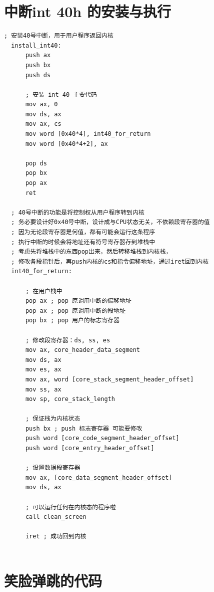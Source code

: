 \documentclass[forprint]{WHUBachelor}
\begin{document}
\chapter{中断int 40h 的安装与执行}

\label{code:int40h}
\begin{lstlisting}[language={[x86masm]Assembler}]
  ; 安装40号中断，用于用户程序返回内核
  install_int40:
      push ax
      push bx
      push ds
  
      ; 安装 int 40 主要代码
      mov ax, 0
      mov ds, ax
      mov ax, cs
      mov word [0x40*4], int40_for_return 
      mov word [0x40*4+2], ax
      
      pop ds
      pop bx
      pop ax
      ret
  
  ; 40号中断的功能是将控制权从用户程序转到内核
  ; 务必要设计好0x40号中断，设计成与CPU状态无关，不依赖段寄存器的值
  ; 因为无论段寄存器是何值，都有可能会运行这条程序
  ; 执行中断的时候会将地址还有符号寄存器存到堆栈中
  ; 考虑先将堆栈中的东西pop出来，然后转移堆栈到内核栈，
  ; 修改各段指针后，再push内核的cs和指令偏移地址，通过iret回到内核
  int40_for_return:
  
      ; 在用户栈中
      pop ax ; pop 原调用中断的偏移地址
      pop ax ; pop 原调用中断的段地址
      pop bx ; pop 用户的标志寄存器
  
      ; 修改段寄存器：ds, ss, es
      mov ax, core_header_data_segment
      mov ds, ax
      mov es, ax
      mov ax, word [core_stack_segment_header_offset]
      mov ss, ax
      mov sp, core_stack_length
  
      ; 保证栈为内核状态
      push bx ; push 标志寄存器 可能要修改
      push word [core_code_segment_header_offset]
      push word [core_entry_header_offset]
  
      ; 设置数据段寄存器
      mov ax, [core_data_segment_header_offset]
      mov ds, ax
  
      ; 可以运行任何在内核态的程序啦
      call clean_screen
  
      iret ; 成功回到内核
  
\end{lstlisting}

\chapter{笑脸弹跳的代码}
\end{document}
